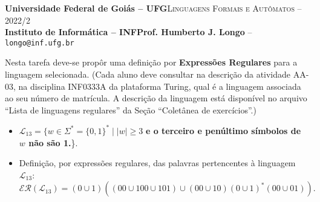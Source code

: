 \documentclass[12pt]{article}
\def\discente{Iury Alexandre Alves Bo}
\def\matricula{202103735}
\def\ua{03}
\def\myling{{13}} %
\begin{document}
 \begin{tcolorbox}[rounded corners, colback=blue!3, colframe=blue!40!black]
  \footnotesize\textbf{Universidade Federal de Goiás -- UFG}\hfill \textsc{Linguagens Formais e Autômatos -- 2022/2}\\
  \footnotesize\textbf{Instituto de Informática -- INF\hfill Prof. Humberto J. Longo} -- \scriptsize\texttt{longo@inf.ufg.br}
 \end{tcolorbox}\bigskip
%
\begin{tcolorbox}[rounded corners, colback=blue!2, colframe=blue!40!black, title=\textbf{Atividade AA-\ua}]
   Nesta tarefa deve-se propôr uma definição por \textbf{Expressões Regulares} para a linguagem selecionada. (Cada aluno deve consultar na descrição da atividade AA-\ua, na disciplina INF0333A da plataforma Turing, qual é a linguagem associada ao seu número de matrícula. A descrição da linguagem está disponível no arquivo ``Lista de linguagens regulares'' da Seção ``Coletânea de exercícios''.)
\end{tcolorbox}\bigskip
%
\begin{tcolorbox}[rounded corners, colback=yellow!5, colframe=red!40!black, title=\textbf{\matricula\ -- \discente}]
 \begin{itemize}[leftmargin=*]
% 
  \item $\mathcal{L}_\myling = \{w\in\Sigma^* = \{0,1\}^* \mid |w| \geq 3$ \textbf{e o terceiro e penúltimo símbolos de $w$ não são 1.}\}.
%
  \item Definição, por expressões regulares, das palavras pertencentes à linguagem $\mathcal{L}_\myling$:
   $$\mathcal{ER}(\mathcal{L}_\myling) =
    (0\cup1)((00\cup100\cup101)\cup(00\cup10)(0\cup1)^*(00\cup01))
   .$$
 \end{itemize}
\end{tcolorbox}


\end{document}
